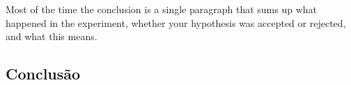 

Most of the time the conclusion is a single paragraph that sums up what happened in the experiment, whether your hypothesis was accepted or rejected, and what this means.


\subsection{Conclusão}



